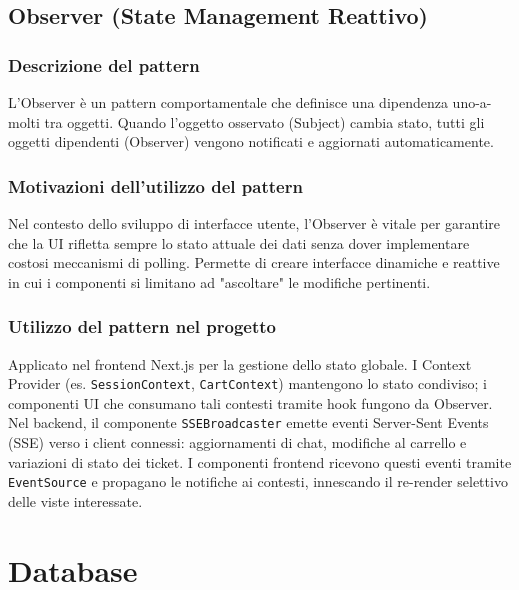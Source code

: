 \documentclass[a4paper, 11pt, oneside]{scrartcl}
\begin{document}
\subsection{Observer (State Management Reattivo)}

\subsubsection{Descrizione del pattern}
L'Observer è un pattern comportamentale che definisce una dipendenza uno-a-molti tra oggetti. Quando l'oggetto osservato (Subject) cambia stato, tutti gli oggetti dipendenti (Observer) vengono notificati e aggiornati automaticamente.

\subsubsection{Motivazioni dell'utilizzo del pattern}
Nel contesto dello sviluppo di interfacce utente, l'Observer è vitale per garantire che la UI rifletta sempre lo stato attuale dei dati senza dover implementare costosi meccanismi di polling. Permette di creare interfacce dinamiche e reattive in cui i componenti si limitano ad "ascoltare" le modifiche pertinenti.

\subsubsection{Utilizzo del pattern nel progetto}
Applicato nel frontend Next.js per la gestione dello stato globale. I Context Provider (es. \texttt{SessionContext}, \texttt{CartContext}) mantengono lo stato condiviso; i componenti UI che consumano tali contesti tramite hook fungono da Observer. Nel backend, il componente \texttt{SSEBroadcaster} emette eventi Server-Sent Events (SSE) verso i client connessi: aggiornamenti di chat, modifiche al carrello e variazioni di stato dei ticket. I componenti frontend ricevono questi eventi tramite \texttt{EventSource} e propagano le notifiche ai contesti, innescando il re-render selettivo delle viste interessate.

\newpage
\section{Database}
\end{document}
